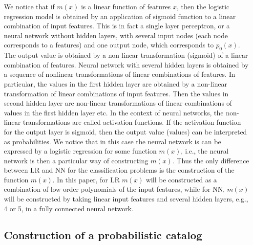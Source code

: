 We notice that if $m(x)$ is a linear function of features $x$, then the logistic regression model is obtained by an application of sigmoid function to a linear combination of input features.
This is in fact a single layer perceptron, or a neural network without hidden layers, with several input nodes (each node corresponds to
a features) and one output node, which corresponds to $p_0(x)$.
The output value is obtained by a non-linear transformation (sigmoid) of a linear combination of features.
Neural network with several hidden layers is obtained by a sequence of nonlinear transformations of linear combinations of features.
In particular, the values in the first hidden layer are obtained by a non-linear transformation of linear combinations of input features.
Then the values in second hidden layer are non-linear transformations of linear combinations of values in the first hidden layer etc.
In the context of neural networks, the non-linear transformations are called activation functions.
If the activation function for the output layer is sigmoid, then the output value (values) can be interpreted as probabilities.
We notice that in this case the neural network is can be expressed by a logistic regression for some function $m(x)$,
i.e., the neural network is then a particular way of constructing $m(x)$.
Thus the only difference between LR and NN for the classification problems is the construction of the function $m(x)$.
In this paper, for LR $m(x)$ will be constructed as a combination of low-order polynomials of the input features,
while for NN, $m(x)$ will be constructed by taking linear input features and several hidden layers, e.g., 4 or 5, 
in a fully connected neural network.

\subsection{Construction of a probabilistic catalog}

